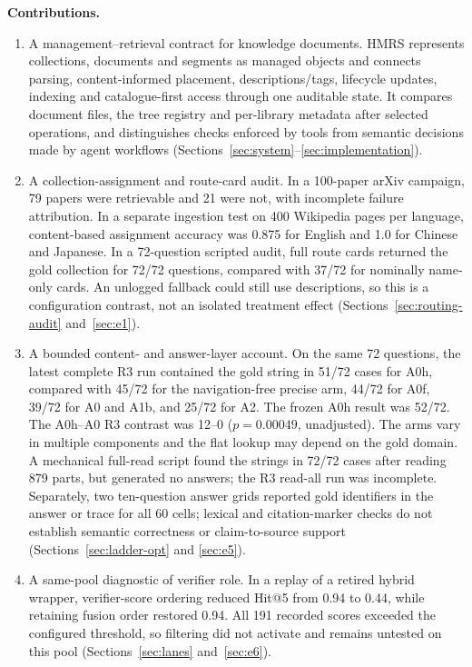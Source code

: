 \noindent\textbf{Contributions.}
\begin{enumerate}
\item A management--retrieval contract for knowledge documents. HMRS represents
collections, documents and segments as managed objects and connects parsing,
content-informed placement, descriptions/tags, lifecycle updates, indexing and
catalogue-first access through one auditable state. It compares document files,
the tree registry and per-library metadata after selected operations, and
distinguishes checks enforced by tools from semantic decisions made by agent
workflows (Sections~\ref{sec:system}--\ref{sec:implementation}).
\item A collection-assignment and route-card audit. In a 100-paper arXiv
campaign, 79 papers were retrievable and 21 were not, with incomplete failure
attribution. In a separate ingestion test on 400 Wikipedia pages per language,
content-based assignment accuracy was 0.875 for English and 1.0 for Chinese and
Japanese. In a 72-question scripted audit, full route cards returned the gold
collection for 72/72 questions, compared with 37/72 for nominally name-only
cards. An unlogged fallback could still use descriptions, so this is a
configuration contrast, not an isolated treatment effect
(Sections~\ref{sec:routing-audit} and~\ref{sec:e1}).
\item A bounded content- and answer-layer account. On the same 72 questions,
the latest complete R3 run contained the gold string in 51/72 cases for A0h,
compared with 45/72 for the navigation-free precise arm, 44/72 for A0f, 39/72
for A0 and A1b, and 25/72 for A2. The frozen A0h result was 52/72. The A0h--A0
R3 contrast was 12--0 ($p=0.00049$, unadjusted). The arms vary in multiple
components and the flat lookup may depend on the gold domain. A mechanical
full-read script found the strings in 72/72 cases after reading 879 parts, but
generated no answers; the R3 read-all run was incomplete. Separately, two
ten-question answer grids reported gold identifiers in the answer or trace for
all 60 cells; lexical and citation-marker checks do not establish semantic
correctness or claim-to-source support (Sections~\ref{sec:ladder-opt} and
\ref{sec:e5}).
\item A same-pool diagnostic of verifier role. In a replay of a retired hybrid
wrapper, verifier-score ordering reduced Hit@5 from 0.94 to 0.44, while retaining
fusion order restored 0.94. All 191 recorded scores exceeded the configured
threshold, so filtering did not activate and remains untested on this pool
(Sections~\ref{sec:lanes} and~\ref{sec:e6}).
\end{enumerate}

